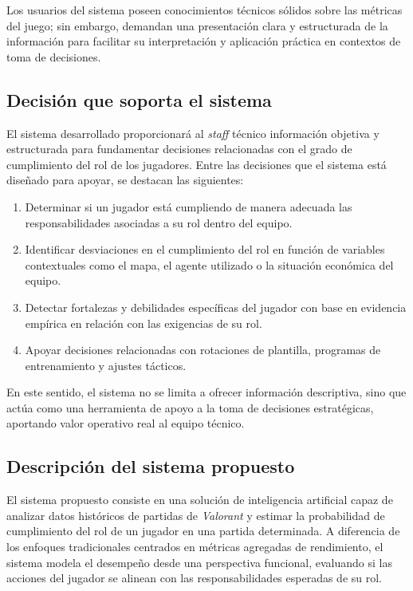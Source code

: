 \documentclass{ULBreport} %
\begin{document}
Los usuarios del sistema poseen conocimientos técnicos sólidos sobre las métricas del juego; sin embargo, demandan una presentación clara y estructurada de la información para facilitar su interpretación y aplicación práctica en contextos de toma de decisiones.

\subsection{Decisión que soporta el sistema}

El sistema desarrollado proporcionará al \textit{staff} técnico información objetiva y estructurada para fundamentar decisiones relacionadas con el grado de cumplimiento del rol de los jugadores. Entre las decisiones que el sistema está diseñado para apoyar, se destacan las siguientes:

\begin{enumerate}
    \item Determinar si un jugador está cumpliendo de manera adecuada las responsabilidades asociadas a su rol dentro del equipo.
    \item Identificar desviaciones en el cumplimiento del rol en función de variables contextuales como el mapa, el agente utilizado o la situación económica del equipo.
    \item Detectar fortalezas y debilidades específicas del jugador con base en evidencia empírica en relación con las exigencias de su rol.
    \item Apoyar decisiones relacionadas con rotaciones de plantilla, programas de entrenamiento y ajustes tácticos.
\end{enumerate}

En este sentido, el sistema no se limita a ofrecer información descriptiva, sino que actúa como una herramienta de apoyo a la toma de decisiones estratégicas, aportando valor operativo real al equipo técnico.

\subsection{Descripción del sistema propuesto}

El sistema propuesto consiste en una solución de inteligencia artificial capaz de analizar datos históricos de partidas de \textit{Valorant} y estimar la probabilidad de cumplimiento del rol de un jugador en una partida determinada. A diferencia de los enfoques tradicionales centrados en métricas agregadas de rendimiento, el sistema modela el desempeño desde una perspectiva funcional, evaluando si las acciones del jugador se alinean con las responsabilidades esperadas de su rol.
\end{document}

